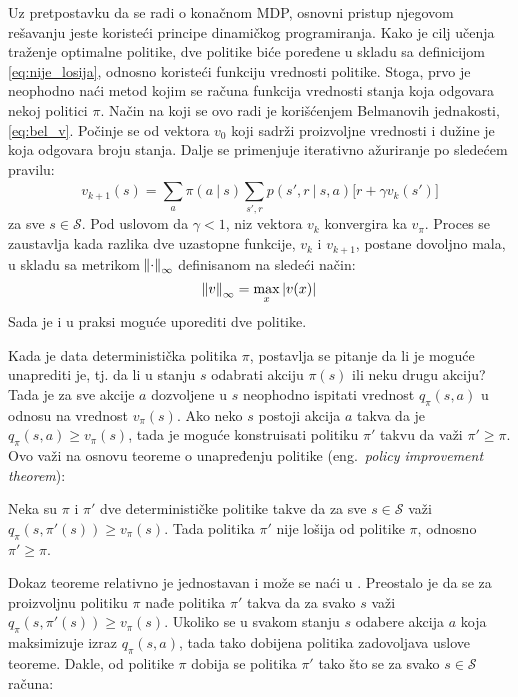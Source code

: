 Uz pretpostavku da se radi o konačnom MDP, osnovni pristup njegovom rešavanju jeste koristeći principe dinamičkog programiranja. Kako je cilj učenja traženje optimalne politike, dve politike biće poređene u skladu sa definicijom \eqref{eq:nije_losija}, odnosno koristeći funkciju vrednosti politike. Stoga, prvo je neophodno naći metod kojim se računa funkcija vrednosti stanja koja odgovara nekoj politici $\pi$.  Način na koji se ovo radi je korišćenjem Belmanovih jednakosti, \eqref{eq:bel_v}. Počinje se od vektora $v_0$ koji sadrži proizvoljne vrednosti i dužine je koja odgovara broju stanja. Dalje se primenjuje iterativno ažuriranje po sledećem pravilu:
\begin{equation}
		v_{k+1}(s) = \sum_{a}^{} \pi(a~|~s)\sum_{s', r}^{}p(s', r~|~s, a) \big[ r+\gamma v_k(s') \big]
\end{equation}
za sve $s \in \mathcal{S}$. Pod uslovom da $\gamma < 1$, niz vektora $v_k$ konvergira ka $v_{\pi}$. Proces se zaustavlja kada razlika dve uzastopne funkcije, $v_k$ i $v_{k+1}$, postane dovoljno mala, u skladu sa metrikom $\norm{\cdot}_{\infty}$ definisanom na sledeći način:
\begin{equation}
	\label{eq:norm_conv}
	\norm{v}_{\infty} = \max_x|v(x)|
\end{equation}
Sada je i u praksi moguće uporediti dve politike.
\par 
Kada je data deterministička politika $\pi$, postavlja se pitanje da li je moguće unaprediti je, tj. da li u stanju $s$ odabrati akciju $\pi(s)$ ili neku drugu akciju? Tada je za sve akcije $a$ dozvoljene u $s$ neophodno ispitati vrednost $q_{\pi}(s,a)$ u odnosu na vrednost $v_{\pi}(s)$. Ako neko $s$ postoji akcija $a$ takva da je $q_{\pi}(s, a) \geq v_{\pi}(s)$, tada je moguće konstruisati politiku $\pi'$ takvu da važi $\pi' \geq \pi$. Ovo važi na osnovu teoreme o unapređenju politike (eng.~{\em policy improvement theorem}):
\begin{theorem*}
	Neka su $\pi$ i $\pi'$ dve determinističke politike takve da za sve $s \in \mathcal{S}$ važi $q_{\pi}(s, \pi'(s)) \geq v_{\pi}(s)$. Tada politika $\pi'$ nije lošija od politike $\pi$, odnosno $\pi' \geq \pi$.
\end{theorem*}
Dokaz teoreme relativno je jednostavan i može se naći u \cite{rli_tup}. Preostalo je da se za proizvoljnu politiku $\pi$ nađe politika $\pi'$ takva da za svako $s$ važi $q_{\pi}(s, \pi'(s)) \geq v_{\pi}(s)$. Ukoliko se u svakom stanju $s$ odabere akcija $a$ koja maksimizuje izraz $q_{\pi}(s, a)$, tada tako dobijena politika zadovoljava uslove teoreme. Dakle, od politike $\pi$ dobija se politika $\pi'$ tako što se za svako $s \in \mathcal{S}$ računa:
